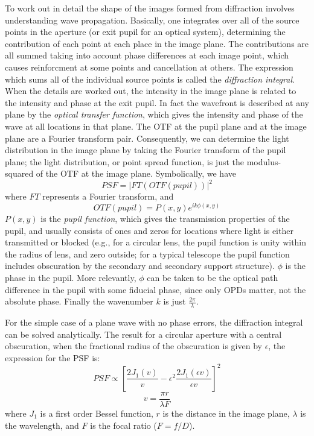 \documentclass[12pt]{article}
\begin{document}
To work out in detail the shape of the images formed from diffraction
involves understanding wave propagation. Basically, one integrates
over all of the source points in the aperture (or exit pupil for an
optical system), determining the contribution of each point at each
place in the image plane. The contributions are all summed taking into
account phase differences at each image point, which causes
reinforcment at some points and cancellation at others. The expression
which sums all of the individual source points is called the
\emph{diffraction integral}. When the details are worked out,
the intensity in the image plane is related to the intensity and phase
at the exit pupil. In fact the wavefront is described at any plane by
the \emph{optical transfer function}, which gives the intensity and phase of
the wave at all locations in that plane. The OTF at the pupil plane
and at the image plane are a Fourier transform pair. Consequently, we
can determine the light distribution in the image plane by taking the
Fourier transform of the pupil plane; the light distribution, or point
spread function, is just the modulus-squared of the OTF at the image
plane. Symbolically, we have{$$
    PSF = \left\vert{FT(OTF(pupil))}\right\vert^{2}
$$}where $FT$ represents a Fourier transform, and{$$
    OTF(pupil) = P(x,y)e^{ik\phi(x,y)}
$$}$P(x,y)$ is the \emph{pupil function}, which gives the transmission
properties of the pupil, and usually consists of ones and zeros for
locations where light is either transmitted or blocked (e.g., for a
circular lens, the pupil function is unity within the radius of lens,
and zero outside; for a typical telescope the pupil function includes
obscuration by the secondary and secondary support structure).
$\phi$ is the phase in the pupil. More relevantly, $\phi$ can be
taken to be the optical path difference in the pupil with some
fiducial phase, since only OPDs matter, not the absolute phase.
Finally the wavenumber $k$ is just $\frac{2\pi}{\lambda}$.

For the simple case of a plane wave with no phase errors, the
diffraction integral can be solved analytically. The result for a
circular aperture with a central obscuration, when the fractional
radius of the obscuration is given by $\epsilon$, the expression for
the PSF is:{$$
    PSF \propto \left[\frac{2J_{1}(v)}{v} -
    \epsilon^{2}\frac{2J_{1}(\epsilon{v})}{\epsilon{v}}\right]^{2}$$$$
    v = \frac{\pi{r}}{\lambda{F}}
$$}where $J_1$ is a first order Bessel function, $r$ is the distance in the
image plane, $\lambda$ is the wavelength, and $F$ is the focal ratio
($F=f/D$).
\end{document}
